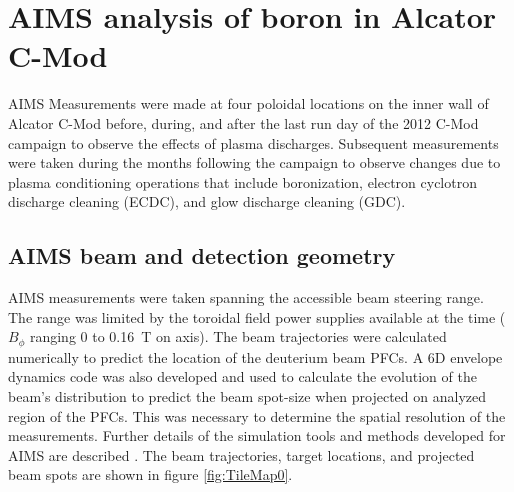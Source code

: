 \documentclass[final,3p,times,twocolumn]{elsarticle}
\begin{document}




\section{AIMS analysis of boron in Alcator C-Mod}

AIMS Measurements were made at four poloidal locations on the inner wall of Alcator C-Mod before, during, and after the last run day of the 2012 C-Mod campaign to observe the effects of plasma discharges. Subsequent measurements were taken during the months following the campaign to observe changes due to plasma conditioning operations that include boronization, electron cyclotron discharge cleaning (ECDC), and glow discharge cleaning (GDC).

\subsection{AIMS beam and detection geometry}

AIMS measurements were taken spanning the accessible beam steering range. The range was limited by the toroidal field power supplies available at the time ($B_\phi$ ranging 0 to 0.16~T on axis). The beam trajectories were calculated numerically to predict the location of the deuterium beam PFCs. A 6D envelope dynamics code was also developed and used to calculate the evolution of the beam's distribution to predict the beam spot-size when projected on analyzed region of the PFCs. This was necessary to determine the spatial resolution of the measurements. Further details of the simulation tools and methods developed for AIMS are described \cite{AIMSBeamSim}. The beam trajectories, target locations, and projected beam spots are shown in figure \ref{fig:TileMap0}.
\end{document}
